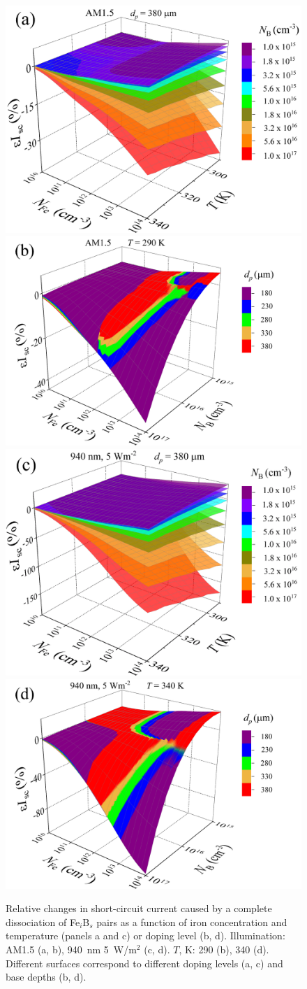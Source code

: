 \documentclass[a4paper,fleqn]{cas-sc}
\begin{document}
\begin{figure}
	\centering
     \includegraphics[width=0.49\linewidth]{Fig3a.png}
     \includegraphics[width=0.49\linewidth]{Fig3b.png}
     \includegraphics[width=0.49\linewidth]{Fig3c.png}
     \includegraphics[width=0.49\linewidth]{Fig3d.png}
	  \caption{Relative changes in short-circuit current caused by a complete
       dissociation of Fe$_i$B$_s$ pairs as a function of
       iron concentration and
       temperature (panels a and c) or doping level (b, d).
       Illumination: AM1.5 (a, b), 940~nm 5~W/m$^{2}$ (c, d).
       $T$, K: 290 (b), 340 (d).
       Different surfaces correspond to different doping levels (a, c) and base depths (b, d).
}\label{fig3}
\end{figure}
\end{document}
